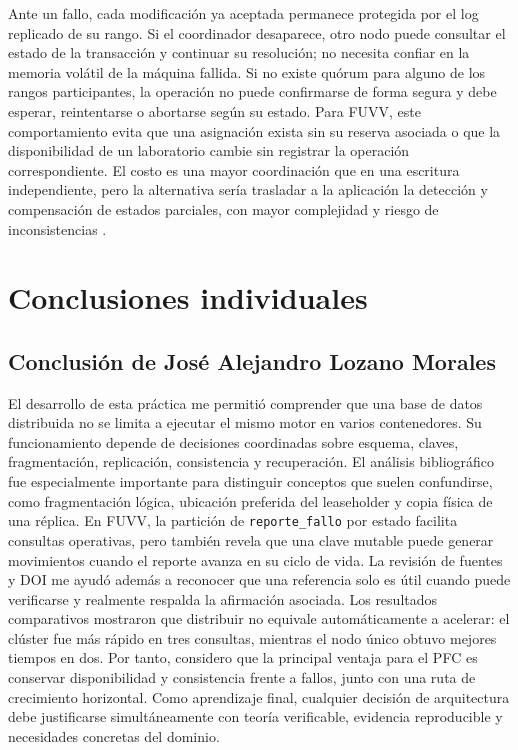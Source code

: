 \documentclass[12pt,a4paper]{article}
\begin{document}
Ante un fallo, cada modificación ya aceptada permanece protegida por el log replicado de su rango. Si el coordinador desaparece, otro nodo puede consultar el estado de la transacción y continuar su resolución; no necesita confiar en la memoria volátil de la máquina fallida. Si no existe quórum para alguno de los rangos participantes, la operación no puede confirmarse de forma segura y debe esperar, reintentarse o abortarse según su estado. Para FUVV, este comportamiento evita que una asignación exista sin su reserva asociada o que la disponibilidad de un laboratorio cambie sin registrar la operación correspondiente. El costo es una mayor coordinación que en una escritura independiente, pero la alternativa sería trasladar a la aplicación la detección y compensación de estados parciales, con mayor complejidad y riesgo de inconsistencias \cite{deheus2022transactions,kleppmann2017ddia}.

\section{Conclusiones individuales}

\subsection{Conclusión de José Alejandro Lozano Morales}

El desarrollo de esta práctica me permitió comprender que una base de datos distribuida no se limita a ejecutar el mismo motor en varios contenedores. Su funcionamiento depende de decisiones coordinadas sobre esquema, claves, fragmentación, replicación, consistencia y recuperación. El análisis bibliográfico fue especialmente importante para distinguir conceptos que suelen confundirse, como fragmentación lógica, ubicación preferida del leaseholder y copia física de una réplica. En FUVV, la partición de \texttt{reporte\_fallo} por estado facilita consultas operativas, pero también revela que una clave mutable puede generar movimientos cuando el reporte avanza en su ciclo de vida. La revisión de fuentes y DOI me ayudó además a reconocer que una referencia solo es útil cuando puede verificarse y realmente respalda la afirmación asociada. Los resultados comparativos mostraron que distribuir no equivale automáticamente a acelerar: el clúster fue más rápido en tres consultas, mientras el nodo único obtuvo mejores tiempos en dos. Por tanto, considero que la principal ventaja para el PFC es conservar disponibilidad y consistencia frente a fallos, junto con una ruta de crecimiento horizontal. Como aprendizaje final, cualquier decisión de arquitectura debe justificarse simultáneamente con teoría verificable, evidencia reproducible y necesidades concretas del dominio.
\end{document}

